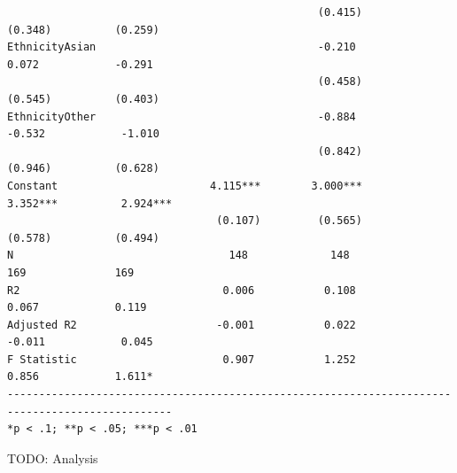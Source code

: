 \documentclass[
]{article}
\begin{document}
\begin{verbatim}
                                                 (0.415)          (0.348)          (0.259)      
EthnicityAsian                                   -0.210            0.072            -0.291      
                                                 (0.458)          (0.545)          (0.403)      
EthnicityOther                                   -0.884           -0.532            -1.010      
                                                 (0.842)          (0.946)          (0.628)      
Constant                        4.115***        3.000***         3.352***          2.924***     
                                 (0.107)         (0.565)          (0.578)          (0.494)      
N                                  148             148              169              169        
R2                                0.006           0.108            0.067            0.119       
Adjusted R2                      -0.001           0.022           -0.011            0.045       
F Statistic                       0.907           1.252            0.856            1.611*      
------------------------------------------------------------------------------------------------
*p < .1; **p < .05; ***p < .01                                                                  
\end{verbatim}

TODO: Analysis

\pagebreak
\end{document}
